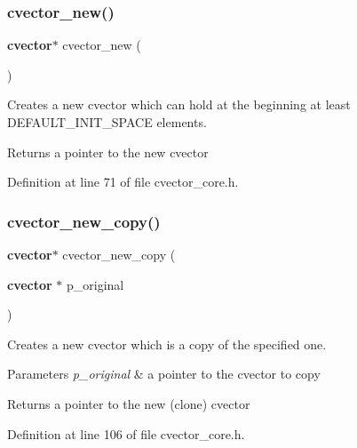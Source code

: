\subsubsection{cvector\+\_\+new()}
{\footnotesize\ttfamily \textbf{ cvector}$\ast$ cvector\+\_\+new (\begin{DoxyParamCaption}{ }\end{DoxyParamCaption})}

Creates a new cvector which can hold at the beginning at least D\+E\+F\+A\+U\+L\+T\+\_\+\+I\+N\+I\+T\+\_\+\+S\+P\+A\+CE elements. \begin{DoxyReturn}{Returns}
a pointer to the new cvector 
\end{DoxyReturn}


Definition at line 71 of file cvector\+\_\+core.\+h.

\mbox{\label{cvector__core_8h_a5106edfcb490caa0a6eb53e4be088fa7}} 
\subsubsection{cvector\+\_\+new\+\_\+copy()}
{\footnotesize\ttfamily \textbf{ cvector}$\ast$ cvector\+\_\+new\+\_\+copy (\begin{DoxyParamCaption}\item[{\textbf{ cvector} $\ast$}]{p\+\_\+original }\end{DoxyParamCaption})}

Creates a new cvector which is a copy of the specified one. 
\begin{DoxyParams}{Parameters}
{\em p\+\_\+original} & a pointer to the cvector to copy \\
\hline
\end{DoxyParams}
\begin{DoxyReturn}{Returns}
a pointer to the new (clone) cvector 
\end{DoxyReturn}


Definition at line 106 of file cvector\+\_\+core.\+h.

\mbox{\label{cvector__core_8h_a8ae393983ad33cb1bc2df73f7d1db615}} 
